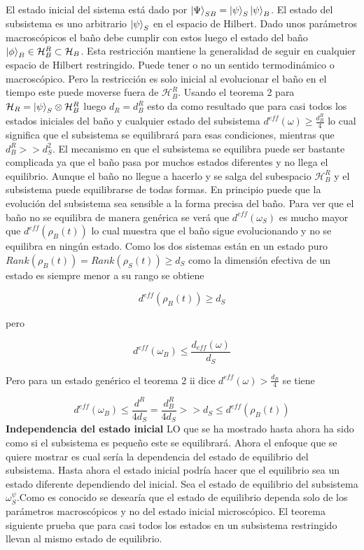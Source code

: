 El estado inicial del sistema está dado por $\ket{\Psi}_{SB}=\ket{\psi}_{S} \ket{\psi}_{B}$. El estado del subsistema es uno arbitrario $\ket{\psi}_{S}$ en el espacio de Hilbert. Dado unos parámetros macroscópicos el baño  debe cumplir con estos luego el estado del baño $\ket{\phi}_{B} \in \mathcal{H}_{B}^{R} \subset\mathcal{H}_{B}$. Esta restricción mantiene la generalidad de seguir en cualquier espacio de Hilbert restringido. Puede tener o no un sentido termodinámico o macroscópico. Pero la restricción es solo inicial al evolucionar el baño en el tiempo este puede moverse fuera de $\mathcal{H}_{B}^{R}$. Usando el teorema 2 para $\mathcal{H}_{R}= \ket{\psi}_{S} \otimes \mathcal{H}_{B}^{R}$ luego $d_{R}=d_{B}^{R}$ esto da como resultado que para casi todos los estados iniciales del baño y cualquier estado del subsistema $d^{eff}(\omega) \geq \frac{d_{B}^{R}}{4}$ lo cual significa que el subsistema se equilibrará para esas condiciones, mientras que $d_{B}^{R} >> d_{S}^{2}$.
El mecanismo en que el subsistema se equilibra puede ser bastante complicada ya que el baño pasa por muchos estados diferentes y no llega el equilibrio. Aunque el baño no llegue a hacerlo y se salga del subespacio $\mathcal{H}_{B}^{R}$ y el subsistema  puede equilibrarse de todas formas. En principio puede que la evolución del subsistema sea sensible a la forma precisa del baño.
Para ver que el baño no se equilibra de manera genérica se verá que $d^{eff}(\omega_{S})$ es mucho mayor que $d^{eff}(\rho_{B}(t))$ lo cual muestra que el baño sigue evolucionando y no se equilibra en ningún estado. Como los dos sistemas están en un estado puro $Rank(\rho_{B}(t))=Rank(\rho_{S}(t)) \geq d_{S}$ como la dimensión efectiva de un estado es siempre menor a su rango se obtiene 

\begin{equation}
d^{eff}(\rho_{B}(t)) \geq d_{S}
\end{equation}

pero 

\begin{equation}
d^{eff}(\omega_{B})\leq \frac{d_{eff}(\omega)}{d_{S}}
\end{equation}

Pero para un estado genérico el teorema 2 ii dice $d^{eff}(\omega) > \frac{d_{R}}{4}$ se tiene

\begin{equation}
d^{eff}(\omega_{B}) \leq \frac{d^{R}}{4d_{S}}=\frac{d_{B}^{R}}{4d_{S}} >>d_{S} \leq d^{eff}(\rho_{B}(t))
\end{equation}
\textbf{Independencia del estado inicial}
LO que se ha mostrado hasta ahora ha sido como si el subsistema es pequeño este se equilibrará. Ahora el enfoque que se quiere mostrar es cual sería la dependencia del estado de equilibrio del subsistema. Hasta ahora el estado inicial podría hacer que el equilibrio sea un estado diferente dependiendo del inicial. Sea el estado de equilibrio del subsistema $\omega_{S}^{\psi}$.Como es conocido se desearía que el estado de equilibrio dependa solo de los parámetros macroscópicos y no del estado inicial microscópico.
El teorema siguiente prueba que para casi todos los estados en un subsistema restringido llevan al mismo estado de equilibrio.

